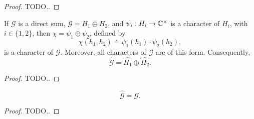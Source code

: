 \begin{proof}
	TODO..
\end{proof}

\begin{prop}
	If $\mathcal{G}$ is a direct sum, $\mathcal{G} = H_1 \oplus H_2$, and
	$\psi_i : H_i \to \mathbb{C}^{\times}$ is a character of $H_i$, with $i \in \{1,2\}$,
	then $\chi = \psi_1 \oplus \psi_2$, defined by
	\[
		\chi(h_1,h_2) \doteq \psi_1(h_1) \cdot \psi_2(h_2),
	\]
	is a character of $\mathcal{G}$. Moreover, all characters of $\mathcal{G}$ are
	of this form. Consequently,
	\[
		\hat{\mathcal{G}} = \hat{H_1} \oplus \hat{H_2}.
	\]
\end{prop}

\begin{proof}
	TODO..
\end{proof}

\begin{cor}
	\[
		\hat{\mathcal{G}} = \mathcal{G}. %
	\]
\end{cor}

\begin{proof}
	TODO..
\end{proof}
